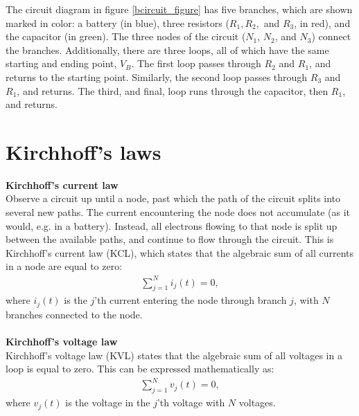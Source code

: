 \noindent The circuit diagram in figure \ref{bcircuit_figure} has five branches, which are shown marked in color: a battery (in blue), three resistors ($R_1, R_2,$ and $R_3$, in red), and the capacitor (in green). The three nodes of the circuit ($N_1$, $N_2$, and $N_3$) connect the branches. Additionally, there are three loops, all of which have the same starting and ending point, $V_{B}$. The first loop passes through $R_2$ and $R_1$, and returns to the starting point. Similarly, the second loop passes through $R_3$ and $R_1$, and returns. The third, and final, loop runs through the capacitor, then $R_1$, and returns. 

\section{Kirchhoff's laws}\label{Klaws}
\textbf{Kirchhoff's current law}
\\
Observe a circuit up until a node, past which the path of the circuit splits into several new paths. The current encountering the node does not accumulate (as it would, e.g. in a battery). Instead, all electrons flowing to that node is split up between the available paths, and continue to flow through the circuit. This is Kirchhoff’s current law (KCL), which states that the algebraic sum of all currents in a node are equal to zero:
\begin{align*}
\sum_{j=1}^{N} i_{j}(t) = 0,
\end{align*}
where $i_{j}(t)$ is the $j$'th current entering the node through branch $j$, with $N$ branches connected to the node. \cite[p.~32]{bcircuit}
\\
\\
\textbf{Kirchhoff's voltage law}
\\
Kirchhoff's voltage law (KVL) states that the algebraic sum of all voltages in a loop is equal to zero. This can be expressed mathematically as:
\begin{align*}
\sum_{j=1}^{N} v_{j}(t) = 0,
\end{align*}
where $v_{j}(t)$ is the voltage in the $j$'th voltage with $N$ voltages. \citep[p.~34]{bcircuit}\\

